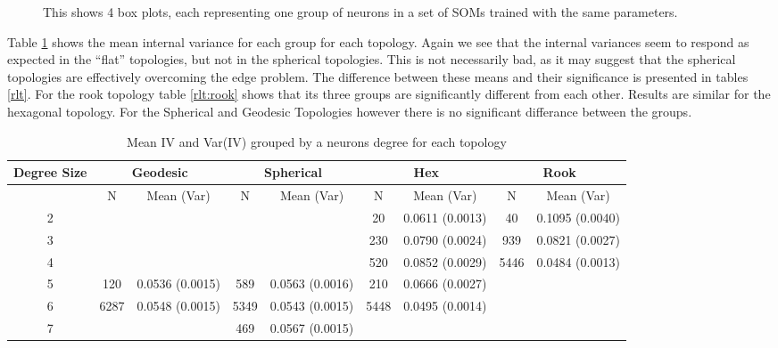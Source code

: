 \begin{figure}[hbt]
\centering
{}
\caption{This shows 4 box plots, each representing one group of neurons in a set
of SOMs trained with the same parameters.}
\label{boxplot}
\end{figure}

Table \ref{meanvar1} shows the mean internal variance for each group for each
topology. Again we see that the internal variances seem to respond as expected
in the ``flat'' topologies, but not in the spherical topologies.  This is not
necessarily bad, as it may suggest that the spherical topologies are
effectively overcoming the edge problem.  The difference between these means
and their significance is presented in tables \ref{rlt}.  For the rook
topology table \ref{rlt:rook} shows that its three groups are significantly
different from each other. Results are similar for the hexagonal topology. For
the Spherical and Geodesic Topologies however there is no significant
differance between the groups.

\begin{table}[hbt]
\caption{Mean IV and Var(IV) grouped by a neurons degree for each topology}
\label{meanvar1}
\begin{tabular}{|c||c|c||c|c||c|c||c|c|}
\hline
\textbf{Degree Size} & \multicolumn{2}{c||}{\textbf{Geodesic}} &
\multicolumn{2}{c||}{\textbf{Spherical}} & \multicolumn{2}{c||}{\textbf{Hex}} &
\multicolumn{2}{c||}{\textbf{Rook}} \\
\hline
& N & Mean (Var) & N & Mean (Var) & N & Mean (Var) & N & Mean (Var) \\
\hline
2&&&&& 20& 0.0611 (0.0013)& 40& 0.1095 (0.0040)\\ 
3&&&&& 230& 0.0790 (0.0024)& 939& 0.0821 (0.0027)\\ 
4&&&&& 520& 0.0852 (0.0029)& 5446& 0.0484 (0.0013)\\ 
5& 120& 0.0536 (0.0015)& 589& 0.0563 (0.0016)& 210& 0.0666 (0.0027)&&\\ 
6& 6287& 0.0548 (0.0015)& 5349& 0.0543 (0.0015)& 5448& 0.0495 (0.0014)&&\\ 
7&&& 469& 0.0567 (0.0015)&&&&\\ 
\hline
\end{tabular} \end{table}



